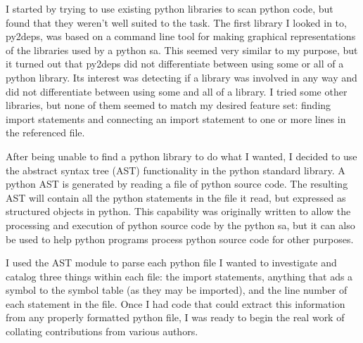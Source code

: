 \documentclass[a4paper,man,natbib,floatsintext]{apa6}
\begin{document}
  I started by trying to use existing \gls{python} libraries to scan \Gls{python} code, but found that they weren't well suited to the task. The first library I looked in to, py2deps, was based on a command line tool for making graphical representations of the libraries used by a \Gls{python} \gls{sa}. This seemed very similar to my purpose, but it turned out that py2deps did not differentiate between using some or all of a python library. Its interest was detecting if a library was involved in any way and did not differentiate between using some and all of a library. I tried some other libraries, but none of them seemed to match my desired feature set: finding import statements and connecting an import statement to one or more lines in the referenced file.

  After being unable to find a \Gls{python} library to do what I wanted, I decided to use the abstract syntax tree (AST) functionality in the \Gls{python} standard library. A \Gls{python} AST is generated by reading a file of \Gls{python} source code. The resulting AST will contain all the \Gls{python} statements in the file it read, but expressed as structured objects in \Gls{python}. This capability was originally written to allow the processing and execution of \Gls{python} source code by the \Gls{python} \gls{sa}, but it can also be used to help \Gls{python} programs process \Gls{python} source code for other purposes.

  I used the AST module to parse each \Gls{python} file I wanted to investigate and catalog three things within each file: the import statements, anything that ads a symbol to the symbol table (as they may be imported), and the line number of each statement in the file. Once I had code that could extract this information from any properly formatted \Gls{python} file, I was ready to begin the real work of collating contributions from various authors.
\end{document}
